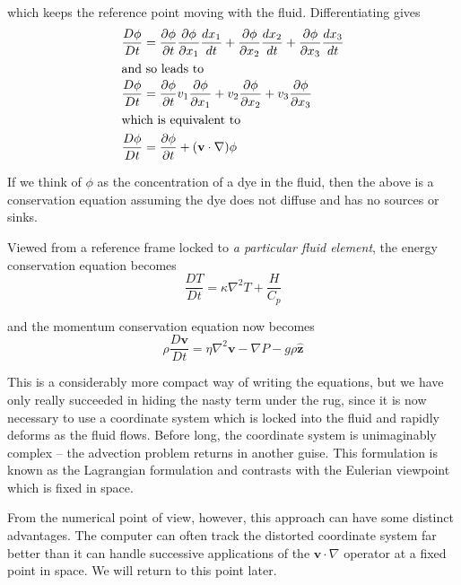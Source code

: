 \documentclass[10pt]{article}
\begin{document}
	which keeps the reference point moving with the fluid. Differentiating gives	
		\begin{align}
				\frac{D \phi}{D t} &= \frac{\partial \phi}{\partial t}
									\frac{\partial \phi}{\partial x_1}\frac{d x_1}{d t} + 
									\frac{\partial \phi}{\partial x_2}\frac{d x_2}{d t} +
									\frac{\partial \phi}{\partial x_3}\frac{d x_3}{d t} \nonumber \\
		\intertext{and so leads to}
				\frac{D \phi}{D t} &= 	\frac{\partial \phi}{\partial t}
									v_1 \frac{\partial \phi}{\partial x_1} + 
									v_2 \frac{\partial \phi}{\partial x_2} +
									v_3 \frac{\partial \phi}{\partial x_3}  \nonumber \\
		\intertext{which is equivalent to}
				\frac{D \phi}{D t} &= \frac{\partial \phi}{\partial t} + (\mathbf{v} \cdot \nabla) \phi							
		\end{align}		
					
	If we think of $\phi$ as the concentration of a dye in the fluid, then the above is
	a conservation equation assuming the dye does not diffuse and has no sources
	or sinks.				
					
	Viewed from a reference frame locked to {\em a particular fluid element}, the 
	energy conservation equation becomes
		\begin{equation}
				\frac{D T}{Dt} =
						\kappa \nabla^2 T + \frac{H}{C_p}
		\end{equation}
		
	and the momentum conservation equation now becomes
		\begin{equation}
			\rho %
			\frac{D \mathbf{v} }{D t} =
						 	\eta \nabla^2 \mathbf{v} - \nabla P 	
						 	- g\rho\hat{\mathbf{z}}      
		\end{equation}		
				
	This is a considerably more compact way of writing the equations, but  
	we have only really succeeded in hiding the nasty term under the rug, since
	it is now necessary to use a coordinate system which is locked into the fluid
	and rapidly deforms as the fluid flows. Before long, the coordinate system
	is unimaginably complex -- the advection problem returns in another guise. This
	formulation is known as the Lagrangian formulation and contrasts with
	the Eulerian viewpoint which is fixed in space.
	
	From the numerical point of view, however, this approach can have some 
	distinct advantages. The computer can often track the distorted coordinate
	system far better than it can handle successive applications of the 
	$\mathbf{v} \cdot \nabla$ operator at a fixed point in space. We
	will return to this point later.
	
\end{document}
